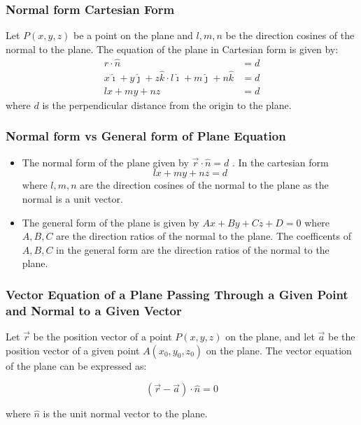 \begin{frame}
\frametitle{Normal form Cartesian Form}
 Let \(P(x,y,z)\) be a point on the plane and \( l,m,n\) be the direction cosines of the normal to the plane. The equation of the plane in Cartesian form is given by: 
 \begin{align*}
 r \cdot \hat{n} &= d \\
 x \hat{\imath} + y \hat{\jmath} + z \hat{k} \cdot l \hat{\imath} + m \hat{\jmath} + n \hat{k} &= d \\
 lx + my + nz &= d
 \end{align*}
where \(d\) is the perpendicular distance from the origin to the plane. 
\end{frame} 

\begin{frame}
\frametitle{Normal form vs General form of Plane Equation}
\begin{itemize}
\item The normal form  of the plane given by \( \vec{r} \cdot \hat{n} = d\) . In the cartesian form  
\[ lx + my + nz = d \] 
where \(l,m,n\) are the direction cosines of the normal to the plane as the normal is a unit vector.

\item The general form of the plane is given by \(Ax + By + Cz + D = 0\) where \(A,B,C\) are the direction ratios of the normal to the plane. The coefficents of \(A,B,C\) in the general form are the direction ratios of the normal to the plane.
\end{itemize}
\end{frame}

\begin{frame}
    \frametitle{Vector Equation of a Plane Passing Through
a Given Point and Normal to a Given Vector}

Let \( \vec{r} \) be the position vector of a point \( P(x,y,z) \) on the plane, and let \( \vec{a} \) be the position vector of a given point \( A(x_0,y_0,z_0) \) on the plane. The vector equation of the plane can be expressed as:

\[
(\vec{r} - \vec{a}) \cdot \hat{n} = 0
\]

where \( \hat{n} \) is the unit normal vector to the plane.

\end{frame} 

